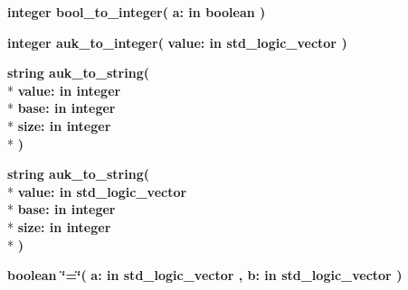 \begin{DoxyCompactItemize}
\item 
{\bfseries {\bfseries \textcolor{comment}{integer}\textcolor{vhdlchar}{ }}} {\bf bool\+\_\+to\+\_\+integer}{\bfseries  ( }{\bfseries \textcolor{vhdlchar}{a\+: }\textcolor{stringliteral}{in }{\bfseries \textcolor{comment}{boolean}\textcolor{vhdlchar}{ }}}{\bfseries  )} 
\item 
{\bfseries {\bfseries \textcolor{comment}{integer}\textcolor{vhdlchar}{ }}} {\bf auk\+\_\+to\+\_\+integer}{\bfseries  ( }{\bfseries \textcolor{vhdlchar}{value\+: }\textcolor{stringliteral}{in }{\bfseries \textcolor{comment}{std\+\_\+logic\+\_\+vector}\textcolor{vhdlchar}{ }}}{\bfseries  )} 
\item 
{\bfseries {\bfseries \textcolor{comment}{string}\textcolor{vhdlchar}{ }}} {\bf auk\+\_\+to\+\_\+string}{\bfseries  ( }\\*
{\bfseries \textcolor{vhdlchar}{value\+: }\textcolor{stringliteral}{in }{\bfseries \textcolor{comment}{integer}\textcolor{vhdlchar}{ }}}\\*
{\bfseries \textcolor{vhdlchar}{base\+: }\textcolor{stringliteral}{in }{\bfseries \textcolor{comment}{integer}\textcolor{vhdlchar}{ }}}\\*
{\bfseries \textcolor{vhdlchar}{size\+: }\textcolor{stringliteral}{in }{\bfseries \textcolor{comment}{integer}\textcolor{vhdlchar}{ }}}\\*
{\bfseries  )} 
\item 
{\bfseries {\bfseries \textcolor{comment}{string}\textcolor{vhdlchar}{ }}} {\bf auk\+\_\+to\+\_\+string}{\bfseries  ( }\\*
{\bfseries \textcolor{vhdlchar}{value\+: }\textcolor{stringliteral}{in }{\bfseries \textcolor{comment}{std\+\_\+logic\+\_\+vector}\textcolor{vhdlchar}{ }}}\\*
{\bfseries \textcolor{vhdlchar}{base\+: }\textcolor{stringliteral}{in }{\bfseries \textcolor{comment}{integer}\textcolor{vhdlchar}{ }}}\\*
{\bfseries \textcolor{vhdlchar}{size\+: }\textcolor{stringliteral}{in }{\bfseries \textcolor{comment}{integer}\textcolor{vhdlchar}{ }}}\\*
{\bfseries  )} 
\item 
{\bfseries {\bfseries \textcolor{comment}{boolean}\textcolor{vhdlchar}{ }}} {\bf \char`\"{}=\char`\"{}}{\bfseries  ( }{\bfseries \textcolor{vhdlchar}{a\+: }\textcolor{stringliteral}{in }{\bfseries \textcolor{comment}{std\+\_\+logic\+\_\+vector}\textcolor{vhdlchar}{ }}}{\bfseries  , \textcolor{vhdlchar}{b\+: }\textcolor{stringliteral}{in }{\bfseries \textcolor{comment}{std\+\_\+logic\+\_\+vector}\textcolor{vhdlchar}{ }}}{\bfseries  )} 

\end{DoxyCompactItemize}
